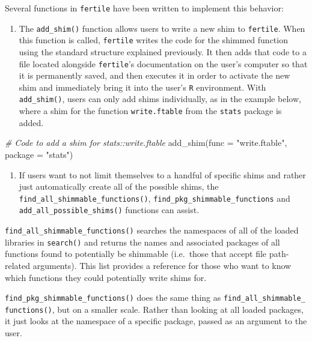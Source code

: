 \documentclass[12pt,twoside]{reedthesis}
\newenvironment{Shaded}{\begin{snugshade}}{\end{snugshade}}
\newcommand{\AttributeTok}[1]{\textcolor[rgb]{0.77,0.63,0.00}{#1}}
\newcommand{\CommentTok}[1]{\textcolor[rgb]{0.56,0.35,0.01}{\textit{#1}}}
\newcommand{\FunctionTok}[1]{\textcolor[rgb]{0.00,0.00,0.00}{#1}}
\newcommand{\NormalTok}[1]{#1}
\newcommand{\StringTok}[1]{\textcolor[rgb]{0.31,0.60,0.02}{#1}}
\providecommand{\tightlist}{%
  \setlength{\itemsep}{0pt}\setlength{\parskip}{0pt}}
\begin{document}
Several functions in \texttt{fertile} have been written to implement this behavior:
\begin{enumerate}
\def\labelenumi{\arabic{enumi}.}
\tightlist
\item
  The \texttt{add\_shim()} function allows users to write a new shim to \texttt{fertile}. When this function is called, \texttt{fertile} writes the code for the shimmed function using the standard structure explained previously. It then adds that code to a file located alongside \texttt{fertile}'s documentation on the user's computer so that it is permanently saved, and then executes it in order to activate the new shim and immediately bring it into the user's \texttt{R} environment. With \texttt{add\_shim()}, users can only add shims individually, as in the example below, where a shim for the function \texttt{write.ftable} from the \texttt{stats} package is added.
\end{enumerate}
\begin{Shaded}
\begin{Highlighting}[]
\CommentTok{\# Code to add a shim for stats::write.ftable }
\FunctionTok{add\_shim}\NormalTok{(}\AttributeTok{func =} \StringTok{"write.ftable"}\NormalTok{, }\AttributeTok{package =} \StringTok{"stats"}\NormalTok{)}
\end{Highlighting}
\end{Shaded}
\begin{enumerate}
\def\labelenumi{\arabic{enumi}.}
\setcounter{enumi}{1}
\tightlist
\item
  If users want to not limit themselves to a handful of specific shims and rather just automatically create all of the possible shims, the \texttt{find\_all\_shimmable\_functions()}, \texttt{find\_pkg\_shimmable\_functions} and \texttt{add\_all\_possible\_shims()} functions can assist.
\end{enumerate}
\texttt{find\_all\_shimmable\_functions()} searches the namespaces of all of the loaded libraries in \texttt{search()} and returns the names and associated packages of all functions found to potentially be shimmable (i.e.~those that accept file path-related arguments). This list provides a reference for those who want to know which functions they could potentially write shims for.

\texttt{find\_pkg\_shimmable\_functions()} does the same thing as \texttt{find\_all\_shimmable\_}
\texttt{functions()}, but on a smaller scale. Rather than looking at all loaded packages, it just looks at the namespace of a specific package, passed as an argument to the user.
\end{document}
